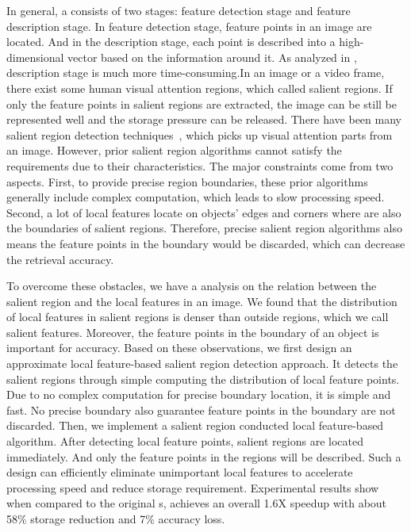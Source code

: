 In general, a {\lfea} consists of two stages: feature detection stage and feature description stage. In feature detection stage, feature points in an image are located. And in the description stage, each point is described into a high-dimensional vector based on the information around it. As analyzed in \cite{chen2012adaptive}, description stage is much more time-consuming.In an image or a video frame, there exist some human visual attention regions, which called salient regions. If only the feature points in salient regions are extracted, the image can be still be represented well and the storage pressure can be released. There have been many salient region detection techniques~\cite{cheng2011global,achanta2009frequency,itti1998model}, which picks up visual attention parts from an image. However, prior salient region algorithms cannot satisfy the requirements due to their characteristics. The major constraints come from two aspects. First, to provide precise region boundaries, these prior algorithms generally include complex computation, which leads to slow processing speed. Second, a lot of local features locate on objects' edges and corners where are also the boundaries of salient regions. Therefore, precise salient region algorithms also means the feature points in the boundary would be discarded, which can decrease the retrieval accuracy.

To overcome these obstacles, we have a analysis on the relation between the salient region and the local features in an image. We found that the distribution of local features in salient regions is denser than outside regions, which we call salient features. Moreover, the feature points in the boundary of an object is important for accuracy. Based on these observations, we first design an approximate local feature-based salient region detection approach. It detects the salient regions through simple computing the distribution of local feature points. Due to no complex computation for precise boundary location, it is simple and fast. No precise boundary also guarantee feature points in the boundary are not discarded. Then, we implement a salient region conducted local feature-based algorithm. After detecting local feature points, salient regions are located immediately. And only the feature points in the regions will be described. Such a design can efficiently eliminate unimportant local features to accelerate processing speed and reduce storage requirement.  Experimental results show when compared to the original {\lfea}s, {\sys} achieves an overall 1.6X speedup with about 58\% storage reduction and 7\% accuracy loss.

